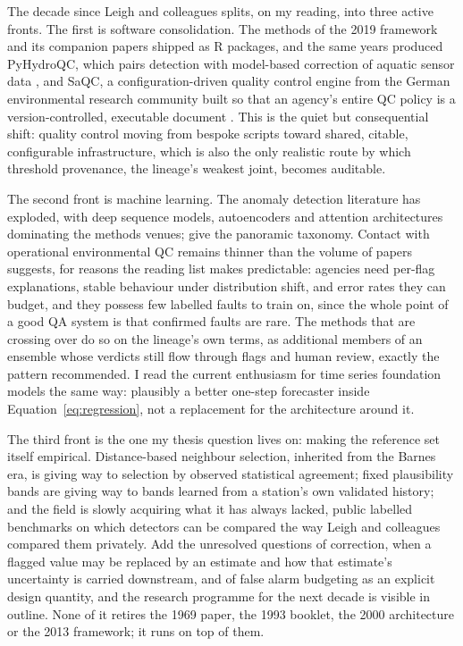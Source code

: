 The decade since Leigh and colleagues splits, on my reading, into three
active fronts. The first is software consolidation. The methods of the 2019
framework and its companion papers shipped as R packages, and the same years
produced PyHydroQC, which pairs detection with model-based correction of
aquatic sensor data \citep{jones2022}, and SaQC, a configuration-driven
quality control engine from the German environmental research community
built so that an agency's entire QC policy is a version-controlled,
executable document \citep{schmidt2023}. This is the quiet but consequential
shift: quality control moving from bespoke scripts toward shared, citable,
configurable infrastructure, which is also the only realistic route by which
threshold provenance, the lineage's weakest joint, becomes auditable.

The second front is machine learning. The anomaly detection literature has
exploded, with deep sequence models, autoencoders and attention
architectures dominating the methods venues; \citet{blazquez2021} give the
panoramic taxonomy. Contact with operational environmental QC remains
thinner than the volume of papers suggests, for reasons the reading list
makes predictable: agencies need per-flag explanations, stable behaviour
under distribution shift, and error rates they can budget, and they possess
few labelled faults to train on, since the whole point of a good QA system
is that confirmed faults are rare. The methods that are crossing over do so
on the lineage's own terms, as additional members of an ensemble whose
verdicts still flow through flags and human review, exactly the pattern
\citet{leigh2019} recommended. I read the current enthusiasm for time series
foundation models the same way: plausibly a better one-step forecaster
inside Equation~\eqref{eq:regression}, not a replacement for the
architecture around it.

The third front is the one my thesis question lives on: making the reference
set itself empirical. Distance-based neighbour selection, inherited from the
Barnes era, is giving way to selection by observed statistical agreement;
fixed plausibility bands are giving way to bands learned from a station's own
validated history; and the field is slowly acquiring what it has always
lacked, public labelled benchmarks on which detectors can be compared the
way Leigh and colleagues compared them privately. Add the unresolved
questions of correction, when a flagged value may be replaced by an estimate
and how that estimate's uncertainty is carried downstream, and of false
alarm budgeting as an explicit design quantity, and the research programme
for the next decade is visible in outline. None of it retires the 1969
paper, the 1993 booklet, the 2000 architecture or the 2013 framework; it
runs on top of them.
